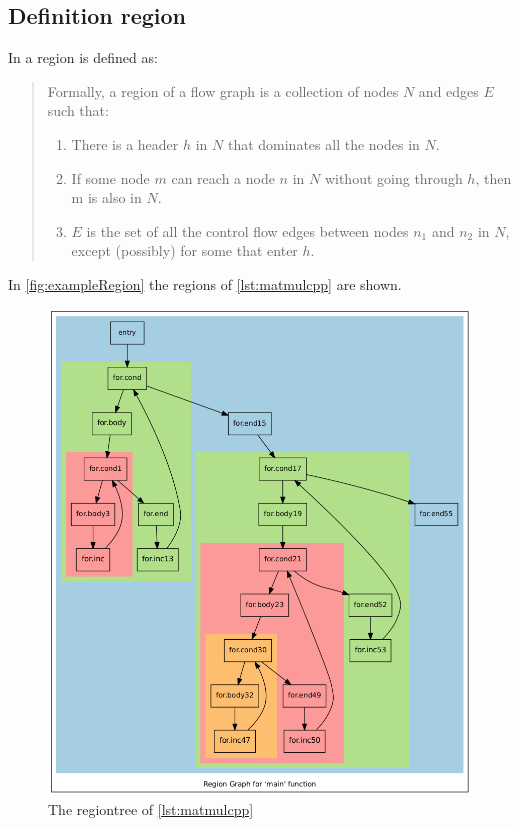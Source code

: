 \subsection{Definition region}\label{subsec:definitionRegion}
In \cite[chapter 9.7.1, p.~672]{Drachenbuch} a region is defined as:

\begin{quote}
    Formally, a region of a flow graph is a collection of nodes \(N\) and edges \(E\) such that:
    \begin{enumerate}
        \item There is a header \(h\) in \(N\) that dominates all the nodes in \(N\).
        \item If some node \(m\) can reach a node \(n\) in \(N\) without going through \(h\), then m is also in \(N\).
        \item \(E\) is the set of all the control flow edges between nodes \(n_1\) and \(n_2\) in \(N\), except (possibly) for some that enter \(h\).
    \end{enumerate}
\end{quote}
In \autoref{fig:exampleRegion} the regions of \autoref{lst:matmulcpp} are shown.
\begin{figure}[!h]
    \centering
    \caption{The regiontree of \autoref{lst:matmulcpp}}
    \label{fig:exampleRegion}
    \includegraphics[width=\textwidth]{gfx/matmulRegions.png}
\end{figure}
